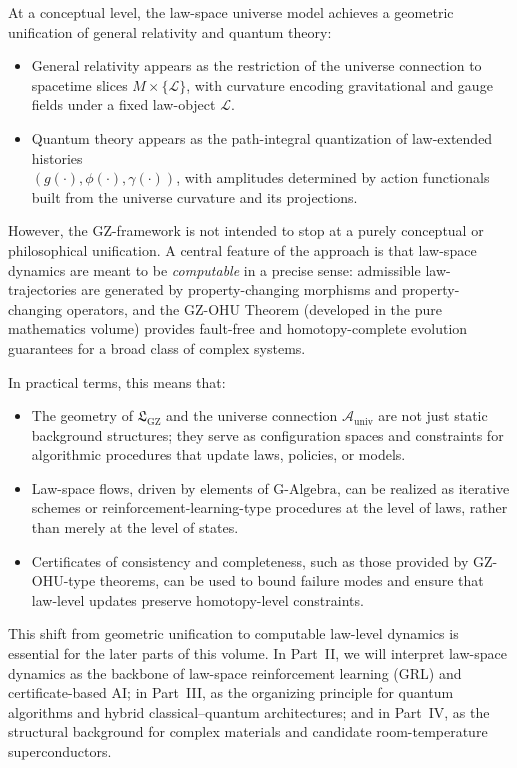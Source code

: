 \documentclass[11pt]{book}
\newcommand{\GAlgebra}{\text{G-Algebra}}
\newcommand{\GZLS}{\ensuremath{\mathfrak{L}_{\mathrm{GZ}}}}
\newcommand{\Base}{\ensuremath{M}}
\theoremstyle{plain}
\theoremstyle{definition}
\theoremstyle{remark}
\begin{document}
At a conceptual level, the law-space universe model achieves a
geometric unification of general relativity and quantum theory:
\begin{itemize}
  \item General relativity appears as the restriction of the universe
        connection to spacetime slices $\Base \times \{\mathcal{L}\}$,
        with curvature encoding gravitational and gauge fields under
        a fixed law-object $\mathcal{L}$.
  \item Quantum theory appears as the path-integral quantization of
        law-extended histories \\$(g(\cdot),\phi(\cdot),\gamma(\cdot))$,
        with amplitudes determined by action functionals built from
        the universe curvature and its projections.
\end{itemize}

However, the GZ-framework is not intended to stop at a purely
conceptual or philosophical unification. A central feature of the
approach is that law-space dynamics are meant to be \emph{computable}
in a precise sense: admissible law-trajectories are generated by
property-changing morphisms and property-changing operators, and
the GZ-OHU Theorem (developed in the pure mathematics volume)
provides fault-free and homotopy-complete evolution guarantees for
a broad class of complex systems.

In practical terms, this means that:
\begin{itemize}
  \item The geometry of $\GZLS$ and the universe connection
        $\mathcal{A}_{\mathrm{univ}}$ are not just static background
        structures; they serve as configuration spaces and constraints
        for algorithmic procedures that update laws, policies, or
        models.
  \item Law-space flows, driven by elements of $\GAlgebra$, can be
        realized as iterative schemes or reinforcement-learning-type
        procedures at the level of laws, rather than merely at the
        level of states.
  \item Certificates of consistency and completeness, such as those
        provided by GZ-OHU-type theorems, can be used to bound
        failure modes and ensure that law-level updates preserve
        homotopy-level constraints.
\end{itemize}



This shift from geometric unification to computable law-level
dynamics is essential for the later parts of this volume. In
Part~II, we will interpret law-space dynamics as the backbone of
law-space reinforcement learning (GRL) and certificate-based AI;
in Part~III, as the organizing principle for quantum algorithms and
hybrid classical--quantum architectures; and in Part~IV, as the
structural background for complex materials and candidate
room-temperature superconductors.
\end{document}
